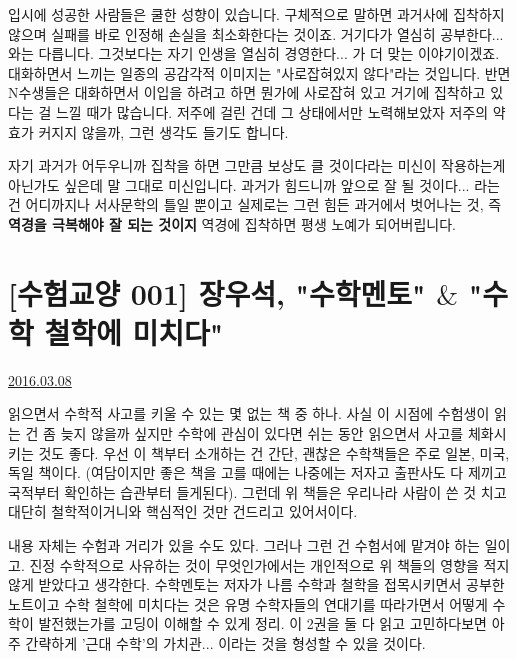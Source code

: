 입시에 성공한 사람들은 쿨한 성향이 있습니다. 구체적으로 말하면 과거사에 집착하지 않으며 실패를 바로 인정해 손실을 최소화한다는 것이죠.
거기다가 열심히 공부한다... 와는 다릅니다. 그것보다는 자기 인생을 열심히 경영한다... 가 더 맞는 이야기이겠죠.
대화하면서 느끼는 일종의 공감각적 이미지는 "사로잡혀있지 않다"라는 것입니다.
반면 N수생들은 대화하면서 이입을 하려고 하면 뭔가에 사로잡혀 있고 거기에 집착하고 있다는 걸 느낄 때가 많습니다.
저주에 걸린 건데 그 상태에서만 노력해보았자 저주의 약효가 커지지 않을까, 그런 생각도 들기도 합니다.
\vspace{5mm}

자기 과거가 어두우니까 집착을 하면 그만큼 보상도 클 것이다라는 미신이 작용하는게 아닌가도 싶은데 말 그대로 미신입니다.
과거가 힘드니까 앞으로 잘 될 것이다... 라는 건 어디까지나 서사문학의 틀일 뿐이고
실제로는 그런 힘든 과거에서 벗어나는 것, 즉 \textbf{역경을 극복해야 잘 되는 것이지} 역경에 집착하면 평생 노예가 되어버립니다.
\vspace{5mm}









\section{[수험교양 001] 장우석, "수학멘토" $\&$ "수학 철학에 미치다"}
\href{https://www.kockoc.com/Apoc/668096}{2016.03.08}

\vspace{5mm}

읽으면서 수학적 사고를 키울 수 있는 몇 없는 책 중 하나.
사실 이 시점에 수험생이 읽는 건 좀 늦지 않을까 싶지만 수학에 관심이 있다면 쉬는 동안 읽으면서 사고를 체화시키는 것도 좋다.
우선 이 책부터 소개하는 건 간단, 괜찮은 수학책들은 주로 일본, 미국, 독일 책이다.
(여담이지만 좋은 책을 고를 때에는 나중에는 저자고 출판사도 다 제끼고 국적부터 확인하는 습관부터 들게된다).
그런데 위 책들은 우리나라 사람이 쓴 것 치고 대단히 철학적이거니와 핵심적인 것만 건드리고 있어서이다.
\vspace{5mm}

내용 자체는 수험과 거리가 있을 수도 있다. 그러나 그런 건 수험서에 맡겨야 하는 일이고.
진정 수학적으로 사유하는 것이 무엇인가에서는 개인적으로 위 책들의 영향을 적지 않게 받았다고 생각한다.
수학멘토는 저자가 나름 수학과 철학을 접목시키면서 공부한 노트이고
수학 철학에 미치다는 것은 유명 수학자들의 연대기를 따라가면서 어떻게 수학이 발전했는가를 고딩이 이해할 수 있게 정리.
이 2권을 둘 다 읽고 고민하다보면 아주 간략하게 '근대 수학'의 가치관... 이라는 것을 형성할 수 있을 것이다.
\vspace{5mm}

